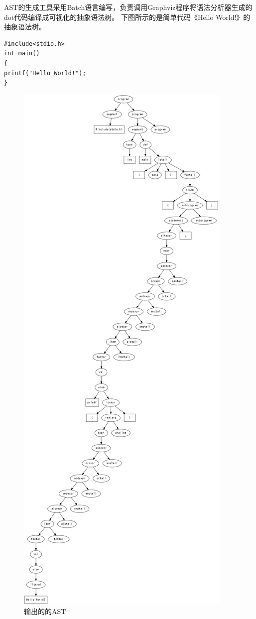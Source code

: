 \documentclass[supercite]{Experimental_Report}
\theoremstyle{definition}
\begin{document}
AST的生成工具采用Batch语言编写，负责调用Graphviz程序将语法分析器生成的dot代码编译成可视化的抽象语法树。
下图所示的是简单代码《Hello World!》的抽象语法树。
\begin{lstlisting}[title =输入的代码,frame=none]
#include<stdio.h>
int main()
{
printf("Hello World!");
}
\end{lstlisting}
\newpage
\begin{figure}[htb]
	\begin{center}
		\includegraphics[scale=0.15]{images/HelloWorld.pdf}
		\caption{输出的的AST}
		\label{fig1-2}
	\end{center}
\end{figure}
\end{document}
